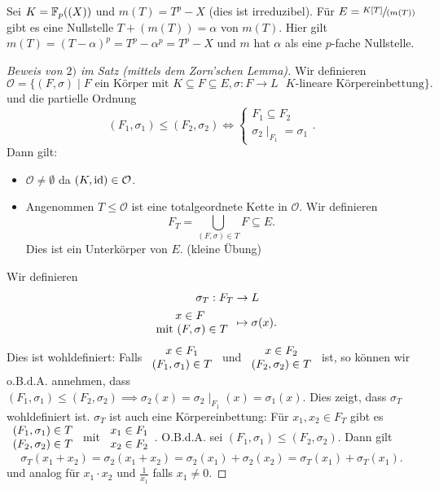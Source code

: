 \begin{eg}
	Sei $K = \mathbb{F}_{p}((X))$ und $m(T) = T^{p} - X$ (dies ist irreduzibel).
	Für $E = \sfrac{K[T]}{(m(T))}$ gibt es eine Nullstelle $T + (m(T)) = \alpha$ von $m(T)$.
	Hier gilt $m(T) = (T - \alpha)^{p} = T^{p} - \alpha^{p} = T^{p} - X$ und $m$ hat $\alpha$ als eine $p$-fache Nullstelle.
\end{eg}

\begin{proof}[Beweis von $2)$ im Satz (mittels dem Zorn'schen Lemma)]
	Wir definieren
	\[
		\mathcal{O} = \{(F,\sigma) \mid F \text{ ein Körper mit } K \subseteq F \subseteq E, \sigma: F \to  L \text{ $K$-lineare Körpereinbettung}\} 
	.\] 
	und die partielle Ordnung
	\[
		(F_1,\sigma_1) \leq (F_2,\sigma_2) \Leftrightarrow \begin{cases}
			F_1 \subseteq F_2\\
			\sigma_{2} \mid_{F_1} = \sigma_1
		\end{cases}
	.\]
	Dann gilt:
	\begin{itemize}
		\item $\mathcal{O} \neq \emptyset$ da $(K,\operatorname{id}) \in \mathcal{O}$.
		\item Angenommen $T \leq \mathcal{O}$ ist eine totalgeordnete Kette in $\mathcal{O}$. Wir definieren
			\[
				F_{T} = \bigcup_{(F,\sigma) \in T} F \subseteq E
			.\] 
			Dies ist ein Unterkörper von $E$. (kleine Übung)
	\end{itemize}
	Wir definieren
	\begin{align*}
		\sigma_{T}: F_{T} &\to L\\
		\begin{array}{c} x \in F\\ \text{ mit } (F,\sigma) \in T\\ \end{array} &\mapsto \sigma(x)
	.\end{align*}
	Dies ist wohldefiniert: Falls $\begin{array}{c} x \in F_1\\ (F_1,\sigma_1) \in T\\ \end{array}$ und $\begin{array}{c} x \in F_2\\ (F_2,\sigma_2) \in T\\ \end{array}$ ist, so können wir o.B.d.A. annehmen,
	dass $(F_1,\sigma_1) \leq (F_2,\sigma_2) \implies \sigma_2(x) = \sigma_2 \mid_{F_1} (x) = \sigma_1(x)$.
	Dies zeigt, dass $\sigma_{T}$ wohldefiniert ist.
	$\sigma_{T}$ ist auch eine Körpereinbettung:
	Für $x_1,x_2 \in F_{T}$ gibt es $\begin{array}{c} (F_1,\sigma_1) \in T\\ (F_2,\sigma_2) \in T\\ \end{array}$ mit $\begin{array}{c} x_1 \in F_1\\ x_2 \in F_2\\ \end{array}$.
	O.B.d.A. sei $(F_1,\sigma_1) \leq (F_2,\sigma_2)$. Dann gilt
	\[
		\sigma_{T}(x_1+x_2) = \sigma_2(x_1+x_2) = \sigma_2(x_1) + \sigma_2(x_2) = \sigma_{T}(x_1) + \sigma_{T}(x_1)
	.\] 
	und analog für $x_1 \cdot x_2$ und $\frac{1}{x_1}$ falls $x_1 \neq 0$.


\end{proof}
